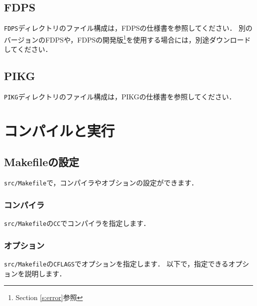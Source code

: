 \documentclass[12pt,a4paper,dvipdfmx]{jsarticle}
\newcommand{\ourcodeR}{GPLUM-2.5\xspace}
\begin{document}
\subsection{FDPS}
\texttt{FDPS}ディレクトリのファイル構成は，FDPSの仕様書を参照してください．
別のバージョンのFDPSや，FDPSの開発版\footnote{Section \ref{s:error}参照}を使用する場合には，別途ダウンロードしてください．

\subsection{PIKG}
\texttt{PIKG}ディレクトリのファイル構成は，PIKGの仕様書を参照してください．



\section{コンパイルと実行}

\subsection{Makefileの設定}

\texttt{src/Makefile}で，コンパイラやオブションの設定ができます．

\subsubsection{コンパイラ}
\texttt{src/Makefile}の\texttt{CC}でコンパイラを指定します．

\subsubsection{オプション}
\texttt{src/Makefile}の\texttt{CFLAGS}でオプションを指定します．
以下で，指定できるオプションを説明します．
\end{document}
